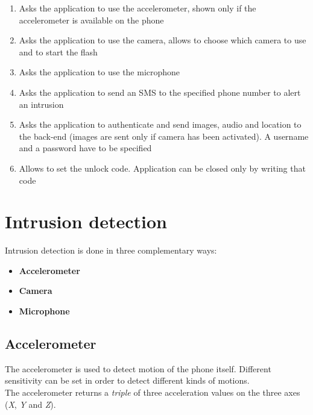 \documentclass[conference]{IEEEtran}
\begin{document}
\begin{enumerate}
	\item Asks the application to use the accelerometer, shown only if the accelerometer is available on the phone
	\item Asks the application to use the camera, allows to choose which camera to use and to start the flash
	\item Asks the application to use the microphone
	\item Asks the application to send an SMS to the specified phone number to alert an intrusion
	\item Asks the application to authenticate and send images, audio and location to the back-end (images are sent only if camera has been activated). A username and a password have to be specified
	\item Allows to set the unlock code. Application can be closed only by writing that code
\end{enumerate}

\section{\textbf{Intrusion detection}}
Intrusion detection is done in three complementary ways:
\begin{itemize}
	\item \textbf{Accelerometer}
	\item \textbf{Camera}
	\item \textbf{Microphone}
\end{itemize}

\subsection{\textbf{Accelerometer}}
The accelerometer is used to detect motion of the phone itself. Different sensitivity can be set in order to detect different kinds of motions.\\
The accelerometer returns a \textit{triple} of three acceleration values on the three axes (\textit{X}, \textit{Y} and \textit{Z}). 
\end{document}
